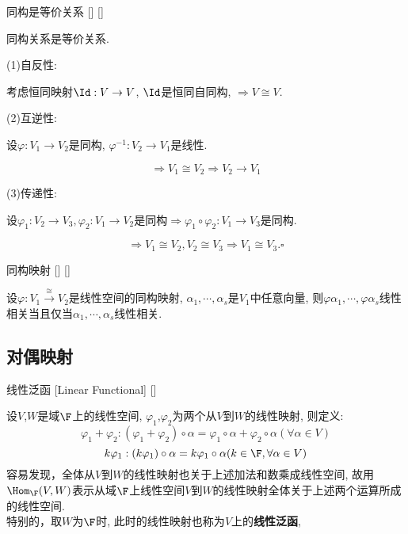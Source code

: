 \documentclass[UTF8]{ctexart}
\begin{document}
		\begin{ppt}
			[]
			{同构是等价关系}
			[]
			[]

			同构关系是等价关系. 
		\end{ppt}

        \begin{prf}
		    (1)自反性: 
			
			考虑恒同映射$\Id:V\to V$, $\Id$是恒同自同构, $\Longrightarrow V\cong V.$
			
			(2)互逆性: 
			
			设$\varphi:V_1\to V_2$是同构, $\varphi^{-1}:V_2\to V_1$是线性. 
			
			\[\Longrightarrow V_1\cong V_2\Longrightarrow V_2\to V_1\]
			
			(3)传递性: 
			
			设$\varphi_1:V_2\to V_3, \varphi_2:V_1\to V_2$是同构$\Longrightarrow\varphi_1\circ\varphi_2: V_1\to V_3$是同构. 
			
			\[\Longrightarrow V_1\cong V_2,V_2\cong V_3\Longrightarrow V_1\cong V_3.\square\]
		\end{prf}
  
        \begin{ppt}
			[]
			{同构映射}
			[]
			[]

            设$\varphi:V_1\xrightarrow{\cong}V_2$是线性空间的同构映射,
            $\alpha_1,\cdots,\alpha_s$是$V_1$中任意向量,
           则$\varphi\alpha_1,\cdots,\varphi\alpha_s$线性相关当且仅当$\alpha_1,\cdots,\alpha_s$线性相关.
        \end{ppt}
  
	\subsection{对偶映射}
        \begin{dfn}
			[]
			{线性泛函}
			[Linear Functional]
			[]

			设$V$,$W$是域$\F$上的线性空间, $\varphi_1$,$\varphi_2$为两个从$V$到$W$的线性映射, 则定义:
			\[\varphi_1+\varphi_2:(\varphi_1+\varphi_2)\circ\alpha=\varphi_1\circ\alpha+\varphi_2\circ\alpha(\forall\alpha\in V)\]
			\[k\varphi_1:(k\varphi_1)\circ\alpha=k\varphi_1\circ\alpha(k\in \F,\forall\alpha\in V)\]
			容易发现，全体从$V$到$W$的线性映射也关于上述加法和数乘成线性空间, 故用$\Hom_{\F}(V,W)$表示从域$\F$上线性空间$V$到$W$的线性映射全体关于上述两个运算所成的线性空间.\\
			特别的，取$W$为$\F$时, 此时的线性映射也称为$V$上的\textbf{线性泛函}, 
		\end{dfn}
\end{document}
